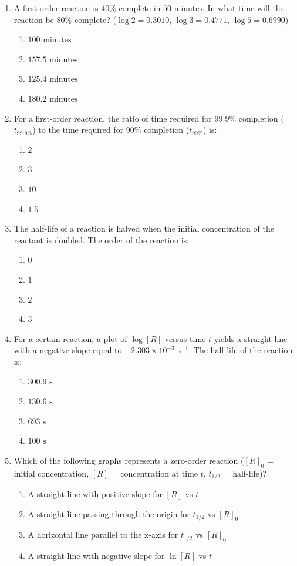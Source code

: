 \documentclass[11pt, a4paper]{article}
\begin{document}
\begin{enumerate}
\item A first-order reaction is $40\%$ complete in $50\text{ minutes}$. In what time will the reaction be $80\%$ complete? ($\log 2 = 0.3010$, $\log 3 = 0.4771$, $\log 5 = 0.6990$)
\begin{enumerate}
    \item $100\text{ minutes}$
    \item $157.5\text{ minutes}$
    \item $125.4\text{ minutes}$
    \item $180.2\text{ minutes}$
\end{enumerate}

\item For a first-order reaction, the ratio of time required for $99.9\%$ completion ($t_{99.9\%}$) to the time required for $90\%$ completion ($t_{90\%}$) is:
\begin{enumerate}
    \item $2$
    \item $3$
    \item $10$
    \item $1.5$
\end{enumerate}

\item The half-life of a reaction is halved when the initial concentration of the reactant is doubled. The order of the reaction is:
\begin{enumerate}
    \item $0$
    \item $1$
    \item $2$
    \item $3$
\end{enumerate}

\item For a certain reaction, a plot of $\log[R]$ versus time $t$ yields a straight line with a negative slope equal to $-2.303 \times 10^{-3}\text{ s}^{-1}$. The half-life of the reaction is:
\begin{enumerate}
    \item $300.9\text{ s}$
    \item $130.6\text{ s}$
    \item $693\text{ s}$
    \item $100\text{ s}$
\end{enumerate}

\item Which of the following graphs represents a zero-order reaction ($[R]_0$ = initial concentration, $[R]$ = concentration at time $t$, $t_{1/2}$ = half-life)?
\begin{enumerate}
    \item A straight line with positive slope for $[R]$ vs $t$
    \item A straight line passing through the origin for $t_{1/2}$ vs $[R]_0$
    \item A horizontal line parallel to the x-axis for $t_{1/2}$ vs $[R]_0$
    \item A straight line with negative slope for $\ln[R]$ vs $t$
\end{enumerate}


\end{enumerate}
\end{document}
